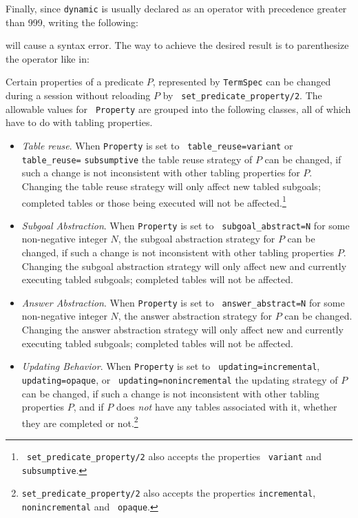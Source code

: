 \begin{description}
    Finally, since {\tt dynamic} is usually declared as an operator with 
    precedence greater than 999, writing the following:


    will cause a syntax error. The way to achieve the desired result is to
    parenthesize the operator like in:



%
Certain properties of a predicate $P$, represented by {\tt TermSpec}
can be changed during a session without reloading $P$ by {\tt
  set\_predicate\_property/2}.  The allowable values for {\tt
  Property} are grouped into the following classes, all of which have
to do with tabling properties.
\begin{itemize}
\item {\em Table reuse}.  When {\tt Property} is set to {\tt
  table\_reuse=variant} or {\tt table\_reuse=} {\tt subsumptive} the
  table reuse strategy of $P$ can be changed, if such a change is not
  inconsistent with other tabling properties for $P$. Changing the
  table reuse strategy will only affect new tabled subgoals; completed
  tables or those being executed will not be affected.\footnote{{\tt
      set\_predicate\_property/2} also accepts the properties {\tt
      variant} and {\tt subsumptive}.}
%
\item {\em Subgoal Abstraction}.  When {\tt Property} is set to {\tt
  subgoal\_abstract=N} for some non-negative integer $N$, the subgoal
  abstraction strategy for $P$ can be changed, if such a change is not
  inconsistent with other tabling properties $P$.  Changing the
  subgoal abstraction strategy will only affect new and currently
  executing tabled subgoals; completed tables will not be affected.
%
\item {\em Answer Abstraction}.  When {\tt Property} is set to {\tt
  answer\_abstract=N} for some non-negative integer $N$, the answer
  abstraction strategy for $P$ can be changed.  Changing the answer
  abstraction strategy will only affect new and currently executing
  tabled subgoals; completed tables will not be affected.
% 
\item {\em Updating Behavior}.  When {\tt Property} is set to {\tt
  updating=incremental}, {\tt updating=opaque}, or {\tt
  updating=nonincremental} the updating strategy of $P$ can be
  changed, if such a change is not inconsistent with other tabling
  properties $P$, and if $P$ does {\em not} have any
  tables associated with it, whether they are completed or
  not.\footnote{{\tt set\_predicate\_property/2} also accepts the
    properties {\tt incremental}, {\tt nonincremental} and {\tt
      opaque}.}
\end{itemize}


\end{description}
